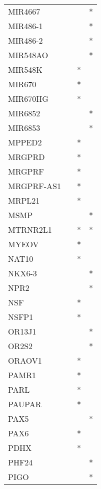 \begin{longtable}{lccc}
MIR4667       &       &    &       * \\
MIR486-1      &       &    &       * \\
MIR486-2      &       &    &       * \\
MIR548AO      &       &    &       * \\
MIR548K       &       &  * &         \\
MIR670        &       &  * &         \\
MIR670HG      &       &  * &         \\
MIR6852       &       &    &       * \\
MIR6853       &       &    &       * \\
MPPED2        &       &  * &         \\
MRGPRD        &       &  * &         \\
MRGPRF        &       &  * &         \\
MRGPRF-AS1    &       &  * &         \\
MRPL21        &       &  * &         \\
MSMP          &       &    &       * \\
MTRNR2L1      &       &  * &       * \\
MYEOV         &       &  * &         \\
NAT10         &       &  * &         \\
NKX6-3        &       &    &       * \\
NPR2          &       &    &       * \\
NSF           &       &  * &         \\
NSFP1         &       &  * &         \\
OR13J1        &       &    &       * \\
OR2S2         &       &    &       * \\
ORAOV1        &       &  * &         \\
PAMR1         &       &  * &         \\
PARL          &       &  * &         \\
PAUPAR        &       &  * &         \\
PAX5          &       &    &       * \\
PAX6          &       &  * &         \\
PDHX          &       &  * &         \\
PHF24         &       &    &       * \\
PIGO          &       &    &       * \\

\end{longtable}
